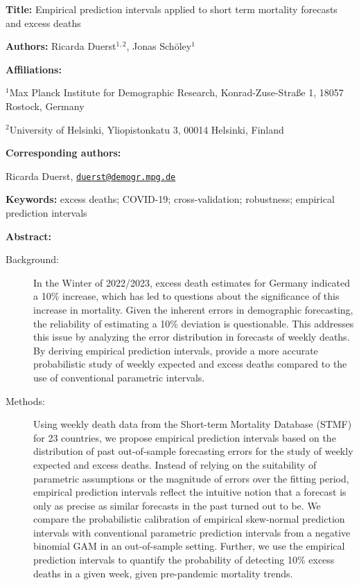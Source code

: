 \documentclass[12pt]{article}
\begin{document}
\begin{titlepage}

  {\textbf{Title:}
  Empirical prediction intervals applied to short term mortality forecasts and excess deaths
  \par\medskip}

  {\textbf{Authors:}
  Ricarda Duerst$^{1,2}$, Jonas Schöley$^{1}$
  \par\medskip}

  {\textbf{Affiliations:}\par
  $^1${Max Planck Institute for Demographic Research, 
  Konrad-Zuse-Straße 1, 
  18057 Rostock, 
  Germany}\par
  $^2${University of Helsinki, 
  Yliopistonkatu 3, 
  00014 Helsinki, 
  Finland}
  \par\medskip}

  {\textbf{Corresponding authors:}\par
  Ricarda Duerst, \href{mailto:duerst@demogr.mpg.de}{\texttt{duerst@demogr.mpg.de}}\par
  \par\medskip}

  {\textbf{Keywords:}
  excess deaths; COVID-19; cross-validation; robustness; empirical prediction intervals
  \par\medskip}

  {\textbf{Abstract:}
  
  \begin{description}
        \item[Background:] In the Winter of 2022/2023, excess death estimates for Germany indicated a 10\% increase, which has led to questions about the significance of this increase in mortality. Given the inherent errors in demographic forecasting, the reliability of estimating a 10\% deviation is questionable. This addresses this issue by analyzing the error distribution in forecasts of weekly deaths. By deriving empirical prediction intervals, provide a more accurate probabilistic study of weekly expected and excess deaths compared to the use of conventional parametric intervals.
        
        \item[Methods:] Using weekly death data from the Short-term Mortality Database (STMF) for 23 countries, we propose empirical prediction intervals based on the distribution of past out-of-sample forecasting errors for the study of weekly expected and excess deaths. Instead of relying on the suitability of parametric assumptions or the magnitude of errors over the fitting period, empirical prediction intervals reflect the intuitive notion that a forecast is only as precise as similar forecasts in the past turned out to be. We compare the probabilistic calibration of empirical skew-normal prediction intervals with conventional parametric prediction intervals from a negative binomial GAM in an out-of-sample setting. Further, we use the empirical prediction intervals to quantify the probability of detecting 10\% excess deaths in a given week, given pre-pandemic mortality trends.
        

\end{description}}
\end{titlepage}
\end{document}
